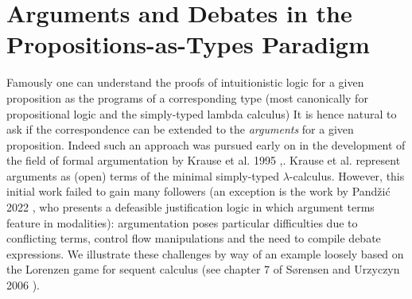 \documentclass{IOS-Book-Article}
\begin{document}
 \section{Arguments and Debates in the Propositions-as-Types Paradigm}\label{sec:argum-debat-prop}
 
  Famously one can understand the proofs of intuitionistic logic for a given proposition as the programs of a corresponding type (most canonically for propositional logic and the simply-typed lambda calculus) 
  It is hence natural to ask if the correspondence can be extended to the \emph{arguments} for a given proposition. Indeed such an approach was pursued early on in the development of the field of formal argumentation by Krause et al. 1995 \cite{KrauseAmblerElvangGoranssonFox1995},\cite{Ambler1996}.
  Krause et al. represent arguments as (open) terms of the minimal simply-typed $\lambda$-calculus. However, this initial work failed to gain many followers (an exception is the work by Pand\v{z}i\'c 2022 \cite{Pandzic2022-PANALO}, who presents a defeasible justification logic in which argument terms feature in modalities):
  argumentation poses particular difficulties due to conflicting terms, control flow manipulations and the need to compile debate expressions. We illustrate these challenges by way of an example loosely based on the Lorenzen game for sequent calculus (see chapter 7 of S{\o}rensen and Urzyczyn 2006 \cite{sorensen_urzyczyn_2006_curry_howard}).
\end{document}

